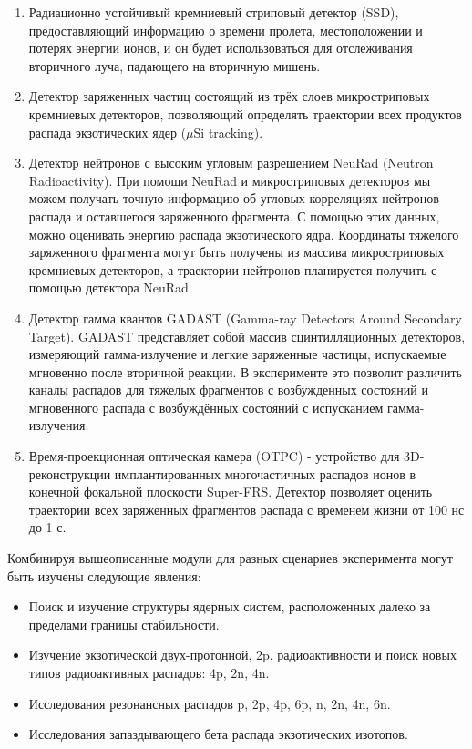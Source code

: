 \begin{enumerate}
	\item Радиационно устойчивый кремниевый стриповый детектор (SSD), предоставляющий информацию о времени пролета, местоположении и потерях энергии ионов, и он будет использоваться для отслеживания вторичного луча, падающего на вторичную мишень.
	\item Детектор заряженных частиц состоящий из трёх слоев микростриповых кремниевых детекторов, позволяющий определять траектории всех продуктов распада экзотических ядер ($\mu$Si tracking).
	\item Детектор нейтронов с высоким угловым разрешением NeuRad (Neutron Radioactivity). При помощи NeuRad и микростриповых детекторов мы можем получать точную информацию об угловых корреляциях нейтронов распада и оставшегося заряженного фрагмента. С помощью этих данных, можно оценивать энергию распада экзотического ядра. Координаты тяжелого заряженного фрагмента могут быть получены из массива микростриповых кремниевых детекторов, а траектории нейтронов планируется получить с помощью детектора NeuRad. 
	\item Детектор гамма квантов GADAST (Gamma-ray Detectors Around Secondary Target). GADAST представляет собой  массив сцинтилляционных детекторов, измеряющий гамма-излучение и легкие заряженные частицы, испускаемые мгновенно после вторичной реакции. В
	эксперименте это позволит различить каналы распадов для тяжелых фрагментов с возбужденных состояний и мгновенного распада с возбуждённых состояний с испусканием гамма-излучения.
	\item Время-проекционная оптическая камера (OTPC) - устройство для 3D-реконструкции имплантированных многочастичных распадов ионов в конечной фокальной плоскости Super-FRS. Детектор позволяет оценить траектории всех заряженных фрагментов распада с временем жизни от 100 нс до 1 с. \cite{Super-FRS}
\end{enumerate}

Комбинируя вышеописанные модули для разных сценариев эксперимента могут быть изучены следующие явления:

\begin{itemize}
	\item Поиск и изучение структуры ядерных систем, расположенных далеко за пределами границы стабильности.
	\item Изучение экзотической двух-протонной, 2p, радиоактивности и поиск новых типов радиоактивных распадов: 4p, 2n, 4n.
	\item Исследования резонансных распадов p, 2p, 4p, 6p, n, 2n, 4n, 6n.
	\item Исследования запаздывающего бета распада экзотических изотопов.
\end{itemize}

